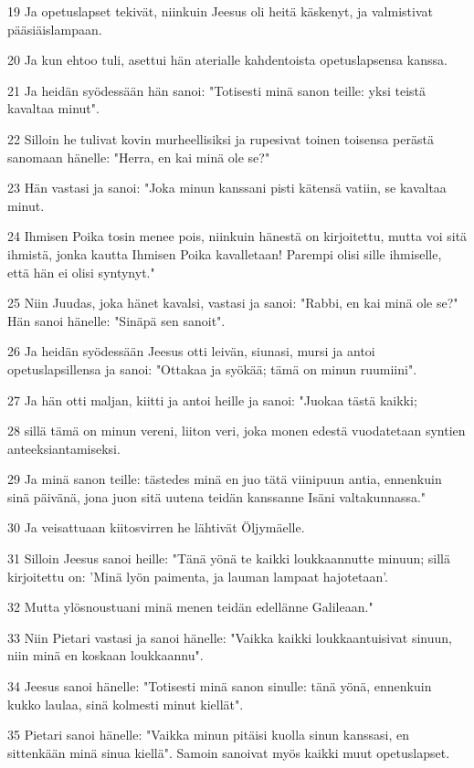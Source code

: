 \par 19 Ja opetuslapset tekivät, niinkuin Jeesus oli heitä käskenyt, ja valmistivat pääsiäislampaan.
\par 20 Ja kun ehtoo tuli, asettui hän aterialle kahdentoista opetuslapsensa kanssa.
\par 21 Ja heidän syödessään hän sanoi: "Totisesti minä sanon teille: yksi teistä kavaltaa minut".
\par 22 Silloin he tulivat kovin murheellisiksi ja rupesivat toinen toisensa perästä sanomaan hänelle: "Herra, en kai minä ole se?"
\par 23 Hän vastasi ja sanoi: "Joka minun kanssani pisti kätensä vatiin, se kavaltaa minut.
\par 24 Ihmisen Poika tosin menee pois, niinkuin hänestä on kirjoitettu, mutta voi sitä ihmistä, jonka kautta Ihmisen Poika kavalletaan! Parempi olisi sille ihmiselle, että hän ei olisi syntynyt."
\par 25 Niin Juudas, joka hänet kavalsi, vastasi ja sanoi: "Rabbi, en kai minä ole se?" Hän sanoi hänelle: "Sinäpä sen sanoit".
\par 26 Ja heidän syödessään Jeesus otti leivän, siunasi, mursi ja antoi opetuslapsillensa ja sanoi: "Ottakaa ja syökää; tämä on minun ruumiini".
\par 27 Ja hän otti maljan, kiitti ja antoi heille ja sanoi: "Juokaa tästä kaikki;
\par 28 sillä tämä on minun vereni, liiton veri, joka monen edestä vuodatetaan syntien anteeksiantamiseksi.
\par 29 Ja minä sanon teille: tästedes minä en juo tätä viinipuun antia, ennenkuin sinä päivänä, jona juon sitä uutena teidän kanssanne Isäni valtakunnassa."
\par 30 Ja veisattuaan kiitosvirren he lähtivät Öljymäelle.
\par 31 Silloin Jeesus sanoi heille: "Tänä yönä te kaikki loukkaannutte minuun; sillä kirjoitettu on: 'Minä lyön paimenta, ja lauman lampaat hajotetaan'.
\par 32 Mutta ylösnoustuani minä menen teidän edellänne Galileaan."
\par 33 Niin Pietari vastasi ja sanoi hänelle: "Vaikka kaikki loukkaantuisivat sinuun, niin minä en koskaan loukkaannu".
\par 34 Jeesus sanoi hänelle: "Totisesti minä sanon sinulle: tänä yönä, ennenkuin kukko laulaa, sinä kolmesti minut kiellät".
\par 35 Pietari sanoi hänelle: "Vaikka minun pitäisi kuolla sinun kanssasi, en sittenkään minä sinua kiellä". Samoin sanoivat myös kaikki muut opetuslapset.
